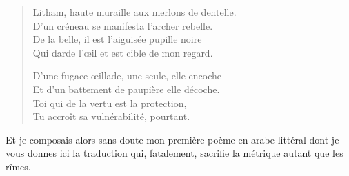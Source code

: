 \begin{verse}
Litham, haute muraille aux merlons de dentelle.\\
D’un créneau se manifesta l’archer rebelle.\\
De la belle, il est l’aiguisée pupille noire\\
Qui darde l’œil et est cible de mon regard.

D’une fugace œillade, une seule, elle encoche\\
Et d’un battement de paupière elle décoche.\\
Toi qui de la vertu est la protection,\\
Tu accroît sa vulnérabilité, pourtant.
\end{verse}



\begin{prose}
Et je composais alors sans doute mon première poème en arabe littéral dont je vous donnes ici la traduction qui, fatalement, sacrifie la métrique autant que les rîmes.
\end{prose}

